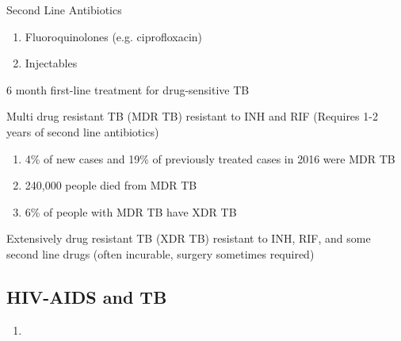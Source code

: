 \documentclass{notes}
\begin{document}
Second Line Antibiotics
\begin{enumerate}
    \item Fluoroquinolones (e.g. ciprofloxacin)
    \item Injectables
\end{enumerate}

6 month first-line treatment for drug-sensitive TB

Multi drug resistant TB (MDR TB) resistant to INH and RIF (Requires 1-2 years of second line antibiotics)
\begin{enumerate}
    \item 4\% of new cases and 19\% of previously treated cases in 2016 were MDR TB
    \item 240,000 people died from MDR TB
    \item 6\% of people with MDR TB have XDR TB
\end{enumerate}

Extensively drug resistant TB (XDR TB) resistant to INH, RIF, and some second line drugs (often incurable, surgery sometimes required)

\subsection*{HIV-AIDS and TB}
\begin{enumerate}
    \item 
\end{enumerate}
\end{document}
